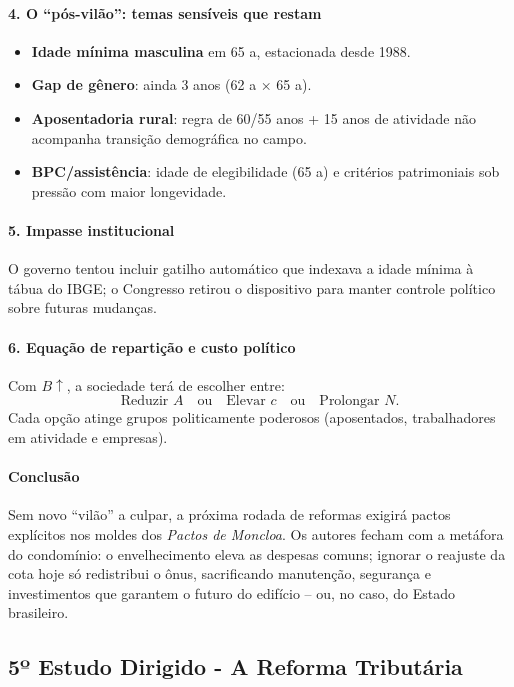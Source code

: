 \documentclass[a4paper,12pt]{article}[abntex2]
\begin{document}
\paragraph{4. O “pós-vilão”: temas sensíveis que restam}
\begin{itemize}
  \item \textbf{Idade mínima masculina} em 65 a, estacionada desde 1988.  
  \item \textbf{Gap de gênero}: ainda 3 anos (62 a × 65 a).  
  \item \textbf{Aposentadoria rural}: regra de 60/55 anos + 15 anos de atividade não acompanha transição demográfica no campo.  
  \item \textbf{BPC/assistência}: idade de elegibilidade (65 a) e critérios patrimoniais sob pressão com maior longevidade.  
\end{itemize}

\paragraph{5. Impasse institucional}  
O governo tentou incluir gatilho automático que indexava a idade mínima à tábua do IBGE; o Congresso retirou o dispositivo para manter controle político sobre futuras mudanças.

\paragraph{6. Equação de repartição e custo político}  
Com $B\uparrow$, a sociedade terá de escolher entre:
\[
\boxed{\text{Reduzir }A}\quad\text{ou}\quad\boxed{\text{Elevar }c}\quad\text{ou}\quad\boxed{\text{Prolongar }N}.
\]
Cada opção atinge grupos politicamente poderosos (aposentados, trabalhadores em atividade e empresas).

\paragraph{Conclusão}  
Sem novo “vilão” a culpar, a próxima rodada de reformas exigirá pactos explícitos nos moldes dos \emph{Pactos de Moncloa}. Os autores fecham com a metáfora do condomínio: o envelhecimento eleva as despesas comuns; ignorar o reajuste da cota hoje só redistribui o ônus, sacrificando manutenção, segurança e investimentos que garantem o futuro do edifício – ou, no caso, do Estado brasileiro.

\newpage
\subsection{\textbf{5º Estudo Dirigido - A Reforma Tributária}}
\end{document}
